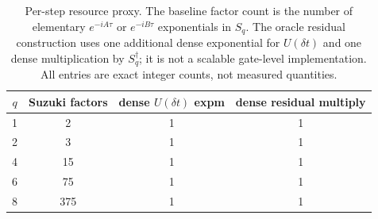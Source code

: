 \begin{table}[t]
\caption{Per-step resource proxy. The baseline factor count is the number of elementary $e^{-iA\tau}$ or $e^{-iB\tau}$ exponentials in $S_q$. The oracle residual construction uses one additional dense exponential for $U(\delta t)$ and one dense multiplication by $S_q^\dagger$; it is not a scalable gate-level implementation. All entries are exact integer counts, not measured quantities.}
\label{tab:resources}
\centering
\begin{tabular}{cccc}
\toprule
$q$ & Suzuki factors & dense $U(\delta t)$ expm & dense residual multiply\\
\midrule
1 & 2 & 1 & 1\\
2 & 3 & 1 & 1\\
4 & 15 & 1 & 1\\
6 & 75 & 1 & 1\\
8 & 375 & 1 & 1\\
\bottomrule
\end{tabular}
\end{table}
